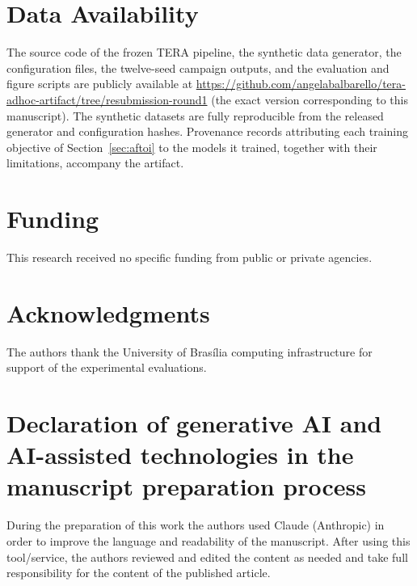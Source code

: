 \documentclass[a4paper,fleqn]{cas-dc}
\begin{document}
\section*{Data Availability}
{\color{\revcolor}The source code of the frozen TERA pipeline, the synthetic data generator, the
configuration files, the twelve-seed campaign outputs, and the evaluation and
figure scripts are publicly available at
\url{https://github.com/angelabalbarello/tera-adhoc-artifact/tree/resubmission-round1}
(the exact version corresponding to this manuscript). The synthetic
datasets are fully reproducible from the released generator and configuration
hashes. Provenance records attributing each training objective of
Section~\ref{sec:aftoi} to the models it trained, together with their
limitations, accompany the artifact.}
\section*{Funding}
This research received no specific funding from public or private agencies.
\section*{Acknowledgments}
The authors thank the University of Bras\'ilia computing infrastructure
for support of the experimental evaluations.
\begin{sloppypar}
\section*{Declaration of generative AI and AI-assisted technologies in the
manuscript preparation process}
{\color{\revcolor}During the preparation of this work the authors used Claude
(Anthropic) in order to improve the language and readability of the
manuscript. After using this tool/service, the authors reviewed and edited
the content as needed and take full responsibility for the content of the
published article.}
\end{sloppypar}


\end{document}

